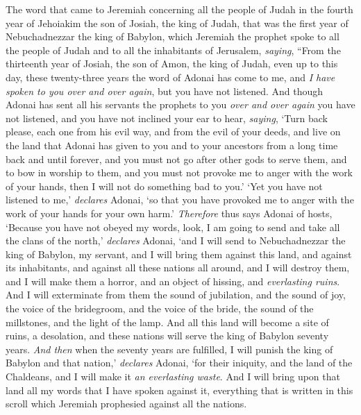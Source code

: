 \begin{biblechapter} %
 The word that came to Jeremiah concerning all the people of Judah in the fourth year of Jehoiakim the son of Josiah, the king of Judah, that was the first year of Nebuchadnezzar the king of Babylon,
\verse which Jeremiah the prophet spoke to all the people of Judah and to all the inhabitants of Jerusalem, \textit{saying},
\verse “From the thirteenth year of Josiah, the son of Amon, the king of Judah, even up to this day, these twenty-three years the word of Adonai has come to me, and \textit{I have spoken to you over and over again}, but you have not listened.
\verse And though Adonai has sent all his servants the prophets to you \textit{over and over again} you have not listened, and you have not inclined your ear to hear,
\verse \textit{saying}, ‘Turn back please, each one from his evil way, and from the evil of your deeds, and live on the land that Adonai has given to you and to your ancestors from a long time back and until forever,
\verse and you must not go after other gods to serve them, and to bow in worship to them, and you must not provoke me to anger with the work of your hands, then I will not do something bad to you.’
\verse ‘Yet you have not listened to me,’ \textit{declares} Adonai, ‘so that you have provoked me to anger with the work of your hands for your own harm.’
\verse \textit{Therefore} thus says Adonai of hosts, ‘Because you have not obeyed my words,
\verse look, I am going to send and take all the clans of the north,’ \textit{declares} Adonai, ‘and I will send to Nebuchadnezzar the king of Babylon, my servant, and I will bring them against this land, and against its inhabitants, and against all these nations all around, and I will destroy them, and I will make them a horror, and an object of hissing, and \textit{everlasting ruins}.
\verse And I will exterminate from them the sound of jubilation, and the sound of joy, the voice of the bridegroom, and the voice of the bride, the sound of the millstones, and the light of the lamp.
\verse And all this land will become a site of ruins, a desolation, and these nations will serve the king of Babylon seventy years.
 \textit{And then} when the seventy years are fulfilled, I will punish the king of Babylon and that nation,’ \textit{declares} Adonai, ‘for their iniquity, and the land of the Chaldeans, and I will make it \textit{an everlasting waste}.
\verse And I will bring upon that land all my words that I have spoken against it, everything that is written in this scroll which Jeremiah prophesied against all the nations.

\end{biblechapter}
